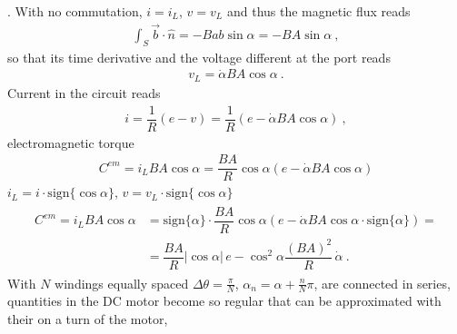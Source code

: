 \documentclass[letterpaper,10pt,english]{jupyterBook}
\begin{document}
\sphinxAtStartPar
{}. With no commutation, \(i = i_L\), \(v = v_L\) and thus the magnetic flux reads
\begin{equation*}
\begin{split}\int_{S} \vec{b} \cdot \hat{n} = - B a b \sin \alpha = - B A \sin \alpha \ ,\end{split}
\end{equation*}
\sphinxAtStartPar
so that its time derivative and the voltage different at the port reads
\begin{equation*}
\begin{split}v_L = \dot{\alpha} B A \cos \alpha \ .\end{split}
\end{equation*}
\sphinxAtStartPar
Current in the circuit reads
\begin{equation*}
\begin{split}i = \dfrac{1}{R} \left( e - v \right) = \dfrac{1}{R} \left( e - \dot{\alpha} B A \cos \alpha \right) \ ,\end{split}
\end{equation*}
\sphinxAtStartPar
electromagnetic torque
\begin{equation*}
\begin{split}C^{em} = i_L B A \cos \alpha =  \dfrac{BA}{R} \cos \alpha \left( e - \dot{\alpha} B A \cos \alpha \right)\end{split}
\end{equation*}
\sphinxAtStartPar
{} \(i_L = i \cdot \text{sign} \{ \cos \alpha \}\), \(v = v_L \cdot \text{sign} \{ \cos \alpha \}\)
\begin{equation*}
\begin{split}\begin{aligned}
  C^{em} = i_L B A \cos \alpha
  & =  \text{sign} \{ \alpha \} \cdot \dfrac{BA}{R} \cos \alpha \left( e - \dot{\alpha} B A \cos \alpha \cdot \text{sign} \{ \alpha \} \right) = \\
  & = \dfrac{BA}{R} \left| \cos \alpha \right| \, e - \cos^2 \alpha  \dfrac{(BA)^2}{R} \, \dot{\alpha} \ .
\end{aligned}\end{split}
\end{equation*}
\sphinxAtStartPar
{} With \(N\) windings equally spaced \(\Delta \theta = \frac{\pi}{N}\), \(\alpha_n = \alpha + \frac{n}{N} \pi\), are connected in series, quantities in the DC motor become so regular that can be approximated with their  on a turn of the motor,
\end{document}
